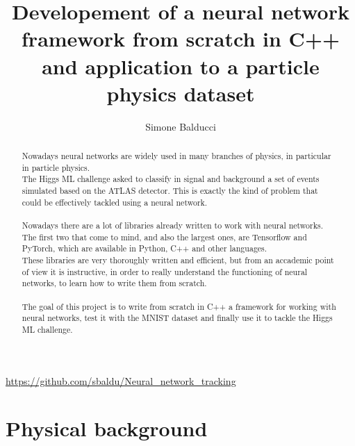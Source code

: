 \documentclass[12pt]{article}
\title{Developement of a neural network framework from scratch in C++ and application to a particle 
physics dataset}
\author{Simone Balducci}
\date{}
\begin{document}
\maketitle
\begin{center}
	\url{https://github.com/sbaldu/Neural_network_tracking}
\end{center}

\begin{abstract}
  \noindent Nowadays neural networks are widely used in many branches of physics, in par\-ti\-cu\-lar 
  in particle physics. \\
  The Higgs ML challenge asked to classify in signal and background a set of events simulated based on the 
  ATLAS detector. This is exactly the kind of problem that could be effectively tackled using a neural 
  network. \\ \\
  Nowadays there are a lot of libraries already written to work with neural networks. The first two that
  come to mind, and also the largest ones, are Tensorflow and PyTorch, which are available in Python, C++ 
  and other languages. \\
  These libraries are very thoroughly written and efficient, but from an accademic point of view it is
  instructive, in order to really understand the functioning of neural networks, to learn how to write 
  them from scratch. \\ \\
  The goal of this project is to write from scratch in C++ a framework for wor\-king with neu\-ral networks, 
  test it with the MNIST dataset and finally use it to tackle the Higgs ML challenge.
\end{abstract}
\pagebreak

\tableofcontents
\pagebreak

\section{Physical background}
\end{document}

